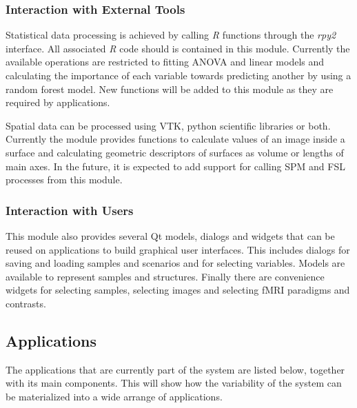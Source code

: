 \subsubsection{Interaction with External Tools}

Statistical data processing is achieved by calling \emph{R} functions through the \emph{rpy2} interface. All associated \emph{R} code should is contained in this module. Currently the available operations are restricted to fitting ANOVA and linear models and calculating the importance of each variable towards predicting another by using a random forest model. New functions will be added to this module as they are required by applications.

Spatial data can be processed using VTK, python scientific libraries or both. Currently the module provides functions to calculate values of an image inside a surface and calculating geometric descriptors of surfaces as volume or lengths of main axes. In the future, it is expected to add support for calling SPM and FSL processes from this module.

\subsubsection{Interaction with Users}

This module also provides several Qt models, dialogs and widgets that can be reused on applications to build graphical user interfaces. This includes dialogs for saving and loading samples and scenarios and for selecting variables. Models are available to represent samples and structures. Finally there are convenience widgets for selecting samples, selecting images and selecting fMRI paradigms and contrasts.

\subsection{Applications}

The applications that are currently part of the system are listed below, together with its main components. This will show how the variability of the system can be materialized into a wide arrange of applications.

